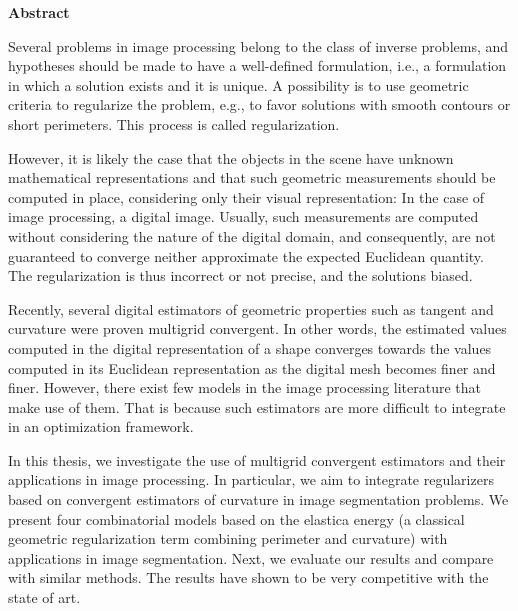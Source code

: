 \begin{center} 
 \textbf{Abstract}
\end{center}

Several problems in image processing belong to the class of inverse problems, and hypotheses should be made to have a well-defined formulation, i.e., a formulation in which a solution exists and it is unique. A possibility is to use geometric criteria to regularize the problem, e.g., to favor solutions with smooth contours or short perimeters. This process is called regularization. 

However, it is likely the case that the objects in the scene have unknown mathematical representations and that such geometric measurements should be computed in place, considering only their visual representation: In the case of image processing, a digital image. Usually, such measurements are computed without considering the nature of the digital domain, and consequently, are not guaranteed to converge neither approximate the expected Euclidean quantity. The regularization is thus incorrect or not precise, and the solutions biased.

Recently, several digital estimators of geometric properties such as tangent and curvature were proven multigrid convergent. In other words, the estimated values computed in the digital representation of a shape converges towards the values computed in its Euclidean representation as the digital mesh becomes finer and finer. However, there exist few models in the image processing literature that make use of them. That is because such estimators are more difficult to integrate in an optimization framework.

In this thesis, we investigate the use of multigrid convergent estimators and their applications in image processing. In particular, we aim to integrate regularizers based on convergent estimators of curvature in image segmentation problems. We present four combinatorial models based on the elastica energy (a classical geometric regularization term combining perimeter and curvature) with applications in image segmentation. Next, we evaluate our results and compare with similar methods. The results have shown to be very competitive with the state of art.